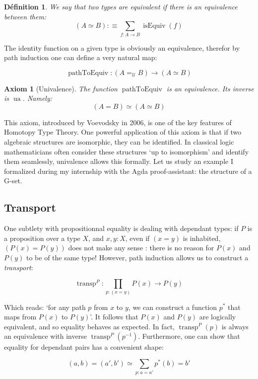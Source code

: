 \documentclass{article}
\DeclareMathOperator{\ua}{ua}
\DeclareMathOperator{\transp}{transp}
\DeclareMathOperator{\isequiv}{isEquiv}
\DeclareMathOperator{\pathtoequiv}{pathToEquiv}
\newtheorem{definition}{Définition}[section]
\newtheorem{axiom}{Axiom}[section]
\begin{document}
\begin{definition}
  We say that two types are \emph{equivalent} if there is an equivalence between them:
  \[(A \simeq B) :\equiv \sum_{f : A \to B} \isequiv(f) \]
\end{definition}

The identity function on a given type is obviously an equivalence, therefor by path induction one can define a very natural map:

\[\pathtoequiv : (A =_{\mathcal{U}} B) \to (A \simeq B)\]

\begin{axiom}[Univalence]
  The function $\pathtoequiv$ is an equivalence. Its inverse is $\ua$. Namely:
  \[(A = B) \simeq (A \simeq B)\]
\end{axiom}

This axiom, introduced by Voevodsky in 2006, is one of the key features of Homotopy Type Theory. One powerful application of this axiom is that if two algebraic structures are isomorphic, they can be identified. In classical logic mathematicians often consider these structures `up to isomorphism' and identify them seamlessly, univalence allows this formally. Let us study an example I formalized during my internship with the Agda proof-assistant: the structure of a G-set.

\subsection{Transport}\label{transport}

One subtlety with propositionnal equality is dealing with dependant types: if $P$ is a proposition over a type $X$, and $x,y : X$, even if $(x = y)$ is inhabited, $(P(x) = P(y))$ does not make any sense : there is no reason for $P(x)$ and $P(y)$ to be of the same type! However, path induction allows us to construct a \emph{transport}:

\[\transp^{P} : \prod_{p : (x = y)} P(x) \to P(y) \]

Which reads: `for any path $p$ from $x$ to $y$, we can construct a function $p^{*}$ that maps from $P(x)$ to $P(y)$'. It follows that $P(x)$ and $P(y)$ are logically equivalent, and so equality behaves as expected. In fact, $\transp^{P}(p)$ is always an equivalence with inverse $\transp^{P}(p^{-1})$. Furthermore, one can show that equality for dependant pairs has a convenient shape:

\[(a, b) = (a', b') \simeq \sum_{p : a = a'}p^*(b) = b'\]
\end{document}
